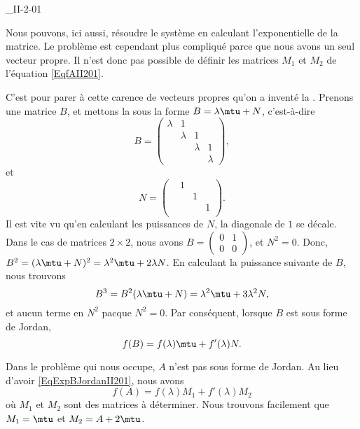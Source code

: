 \begin{corrige}{_II-2-01}
\begin{enumerate}
\begin{alternative}
	Nous pouvons, ici aussi, résoudre le système en calculant l'exponentielle de la matrice. Le problème est cependant plus compliqué parce que nous avons un seul vecteur propre. Il n'est donc pas possible de définir les matrices $M_1$ et $M_2$ de l'équation \eqref{EqfAII201}.

	C'est pour parer à cette carence de vecteurs propres qu'on a inventé la . Prenons une matrice $B$, et mettons la sous la forme $B=\lambda\mtu+N$, c'est-à-dire
\begin{equation}
	B=\begin{pmatrix}
 \lambda	&	1	&		&		\\ 
 	&	\lambda	&	1	&		\\ 
 	&		&	\lambda	&	1	\\ 
	&		&		&	\lambda	 
 \end{pmatrix},
\end{equation}
et 
\begin{equation}
	N=\begin{pmatrix}
 	&	1	&		&		\\ 
 	&		&	1	&		\\ 
 	&		&		&	1	\\ 
	&		&		&		 
 \end{pmatrix}.
\end{equation}
Il est vite vu qu'en calculant les puissances de $N$, la diagonale de $1$ se décale. Dans le cas de matrices $2\times 2$, nous avons $B=\begin{pmatrix}
	0	&	1	\\ 
	0	&	0	
\end{pmatrix}$, et $N^2=0$. Donc, $B^2=(\lambda\mtu+N)^2=\lambda^2\mtu+2\lambda N$. En calculant la puissance suivante de $B$, nous trouvons
\begin{equation}
	B^3=B^2(\lambda\mtu+N)=\lambda^2\mtu+3\lambda^2N,
\end{equation}
et aucun terme en $N^2$ pacque $N^2=0$. Par conséquent, lorsque $B$ est sous forme de Jordan,
\begin{equation}		\label{EqExpBJordanII201}
	f(B)=f(\lambda)\mtu+f'(\lambda)N.
\end{equation}

Dans le problème qui nous occupe, $A$ n'est pas sous forme de Jordan. Au lieu d'avoir \eqref{EqExpBJordanII201}, nous avons
\begin{equation}
	f(A)=f(\lambda)M_1+f'(\lambda)M_2
\end{equation}
où $M_1$ et $M_2$ sont des matrices à déterminer. Nous trouvons facilement que $M_1=\mtu$ et $M_2=A+2\mtu$.



\end{alternative}
\end{enumerate}
\end{corrige}
